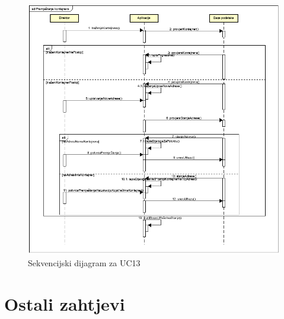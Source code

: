 			\begin{figure}
				\centering
				\includegraphics[width=1.1\linewidth]{"slike/Sekvencijski dijagram za premjestanje kontejnera.png"}
				\caption{Sekvencijski dijagram za UC13}
				\label{fig:sekvencijski-dijagram-za-premjestanje-kontejnera}
			\end{figure}
			
			\clearpage	 

			\section{Ostali zahtjevi}

